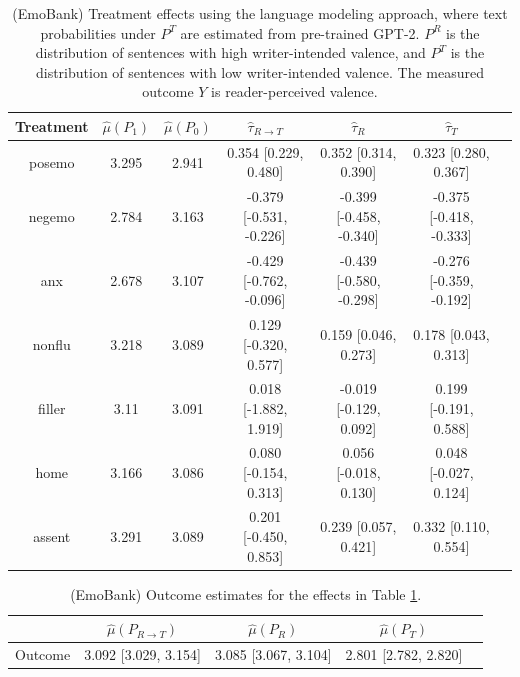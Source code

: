 \documentclass{article}
\begin{document}
\begin{table}[!ht]
\centering
\begin{tabular}{c|cccccc}
\toprule
    Treatment   &   $\hat{\mu}(P_1)$ &   $\hat{\mu}(P_0)$ & $\hat{\tau}_{R \rightarrow T}$   & $\hat{\tau}_R$          & $\hat{\tau}_T$          \\
\midrule
    posemo      &              3.295 &              2.941 & 0.354 [0.229, 0.480]             & 0.352 [0.314, 0.390]    & 0.323 [0.280, 0.367]    \\
    negemo      &              2.784 &              3.163 & -0.379 [-0.531, -0.226]          & -0.399 [-0.458, -0.340] & -0.375 [-0.418, -0.333] \\
    anx         &              2.678 &              3.107 & -0.429 [-0.762, -0.096]          & -0.439 [-0.580, -0.298] & -0.276 [-0.359, -0.192] \\
    nonflu      &              3.218 &              3.089 & 0.129 [-0.320, 0.577]            & 0.159 [0.046, 0.273]    & 0.178 [0.043, 0.313]    \\
    filler      &              3.11  &              3.091 & 0.018 [-1.882, 1.919]            & -0.019 [-0.129, 0.092]  & 0.199 [-0.191, 0.588]   \\
    home        &              3.166 &              3.086 & 0.080 [-0.154, 0.313]            & 0.056 [-0.018, 0.130]   & 0.048 [-0.027, 0.124]   \\
    assent      &              3.291 &              3.089 & 0.201 [-0.450, 0.853]            & 0.239 [0.057, 0.421]    & 0.332 [0.110, 0.554]    \\
\bottomrule
\end{tabular}
\caption{(EmoBank) Treatment effects using the language modeling approach, where text probabilities under $P^T$ are estimated from pre-trained GPT-2. $P^R$ is the distribution of sentences with high writer-intended valence, and $P^T$ is the distribution of sentences with low writer-intended valence. The measured outcome $Y$ is reader-perceived valence.}
\label{tab:results_clm_gpt2_pretrained_emobank}
\end{table}

\begin{table}[!ht]
\centering
\begin{tabular}{c|cccc}
\toprule
    & $\hat{\mu}(P_{R \rightarrow T})$   & $\hat{\mu}(P_R)$     & $\hat{\mu}(P_T)$     \\
\midrule
    Outcome & 3.092 [3.029, 3.154]               & 3.085 [3.067, 3.104] & 2.801 [2.782, 2.820] \\
\bottomrule
\end{tabular}
\caption{(EmoBank) Outcome estimates for the effects in Table \ref{tab:results_clm_gpt2_pretrained_emobank}.}
\label{tab:results_clm_gpt2_pretrained_emobank_outcome}
\end{table}
\end{document}
